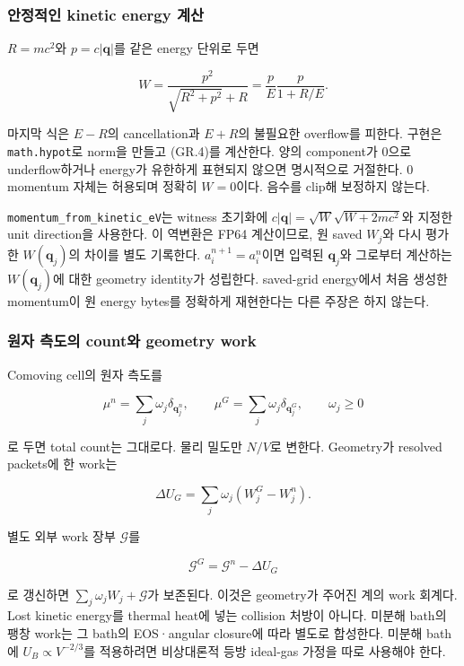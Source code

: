 \documentclass[11pt,a4paper]{article}
\begin{document}
\hypertarget{uxc548uxc815uxc801uxc778-kinetic-energy-uxacc4uxc0b0}{%
\subsubsection{안정적인 kinetic energy 계산}\label{uxc548uxc815uxc801uxc778-kinetic-energy-uxacc4uxc0b0}}

\(R=mc^2\)와 \(p=c|\mathbf q|\)를 같은 energy 단위로 두면

\[
 W=\frac{p^2}{\sqrt{R^2+p^2}+R}
   =\frac{p}{E}\frac{p}{1+R/E}.
\tag{GR.4}
\]

마지막 식은 \(E-R\)의 cancellation과 \(E+R\)의 불필요한 overflow를 피한다. 구현은 \texttt{math.hypot}로 norm을 만들고 (GR.4)를 계산한다. 양의 component가 0으로 underflow하거나 energy가 유한하게 표현되지 않으면 명시적으로 거절한다. 0 momentum 자체는 허용되며 정확히 \(W=0\)이다. 음수를 clip해 보정하지 않는다.

\texttt{momentum\_from\_kinetic\_eV}는 witness 초기화에 \(c|\mathbf q|=\sqrt W\sqrt{W+2mc^2}\)와 지정한 unit direction을 사용한다. 이 역변환은 FP64 계산이므로, 원 saved \(W_j\)와 다시 평가한 \(W(\mathbf q_j)\)의 차이를 별도 기록한다. \(a_i^{n+1}=a_i^n\)이면 입력된 \(\mathbf q_j\)와 그로부터 계산하는 \(W(\mathbf q_j)\)에 대한 geometry identity가 성립한다. saved-grid energy에서 처음 생성한 momentum이 원 energy bytes를 정확하게 재현한다는 다른 주장은 하지 않는다.

\hypertarget{uxc6d0uxc790-uxce21uxb3c4uxc758-countuxc640-geometry-work}{%
\subsubsection{원자 측도의 count와 geometry work}\label{uxc6d0uxc790-uxce21uxb3c4uxc758-countuxc640-geometry-work}}

Comoving cell의 원자 측도를

\[
 \mu^n=\sum_j\omega_j\delta_{\mathbf q_j^n},\qquad
 \mu^G=\sum_j\omega_j\delta_{\mathbf q_j^G},\qquad\omega_j\ge0
\tag{GR.5}
\]

로 두면 total count는 그대로다. 물리 밀도만 \(N/V\)로 변한다. Geometry가 resolved packets에 한 work는

\[
 \Delta U_G=\sum_j\omega_j(W_j^G-W_j^n).
\tag{GR.6}
\]

별도 외부 work 장부 \(\mathcal G\)를

\[
 \mathcal G^G=\mathcal G^n-\Delta U_G
\tag{GR.7}
\]

로 갱신하면 \(\sum_j\omega_jW_j+\mathcal G\)가 보존된다. 이것은 geometry가 주어진 계의 work 회계다. Lost kinetic energy를 thermal heat에 넣는 collision 처방이 아니다. 미분해 bath의 팽창 work는 그 bath의 EOS·angular closure에 따라 별도로 합성한다. 미분해 bath에 \(U_B\propto V^{-2/3}\)를 적용하려면 비상대론적 등방 ideal-gas 가정을 따로 사용해야 한다.
\end{document}
